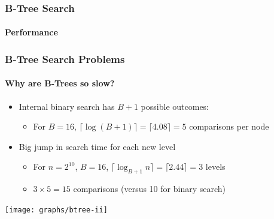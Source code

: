 \documentclass[xcolor=dvipsnames]{beamer}
\begin{document}
\begin{frame}
   \frametitle{B-Tree Search}
   \framesubtitle{Performance}
\end{frame}

\begin{frame}
   \frametitle{B-Tree Search Problems}
   \framesubtitle{Why are B-Trees so slow?}
    
   \begin{itemize}
      \item<+->Internal binary search has $B+1$ possible outcomes:
      \begin{itemize}
        \item<+->For $B=16$, 
                  $\lceil\log(B+1)\rceil = \lceil 4.08\rceil = 5$ comparisons per node
      \end{itemize}
      \item<+->Big jump in search time for each new level 
      \begin{itemize}
        \item<+->For $n=2^{10}$, $B=16$, 
                  $\lceil\log_{B+1}n\rceil = \lceil 2.44\rceil = 3$ levels
        \item<+->$3\times 5 = 15$ comparisons (versus 10 for binary search)
      \end{itemize}
   \end{itemize}
   \begin{center}
      \texttt{[image: graphs/btree-ii]}
   \end{center}
\end{frame}
\end{document}
